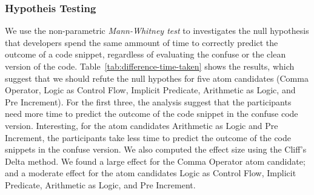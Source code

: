 \begin{table}[htbp]
\caption{Time in seconds to submit a {\color{red}correct} answer}
\label{tab:difference-time-taken}
\end{table}


\subsubsection*{Hypotheis Testing}
We use the non-parametric \emph{Mann-Whitney test} to
investigates the null hypothesis that developers 
spend the same ammount of time to correctly
predict the outcome of a code snippet, regardless
of evaluating the confuse or the clean version
of the code. Table~\ref{tab:difference-time-taken}
shows the results, which suggest that we
should refute the null hypothes for
five atom candidates (Comma Operator, Logic
as Control Flow, Implicit Predicate, Arithmetic
as Logic, and Pre Increment). For the first three,
the analysis suggest that the participants
need more time to predict the outcome of
the code snippet in the confuse code version. Interesting,
for the atom candidates Arithmetic as Logic and
Pre Increment, the participants take less time
to predict the outcome of the code snippets in
the confuse version.
We also computed the effect size using the Cliff's Delta method.
We found a large effect for the Comma Operator atom
candidate; and a moderate effect for the atom candidates
Logic as Control Flow, Implicit Predicate, Arithmetic
as Logic, and Pre Increment. 

